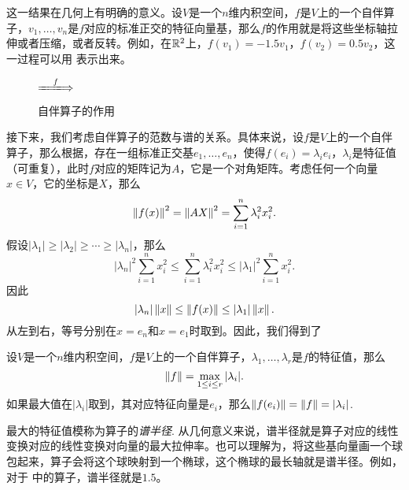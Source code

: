 这一结果在几何上有明确的意义。设$V$是一个$n$维内积空间，$f$是$V$上的一个自伴算子，$v_1,\dots,v_n$是$f$对应的标准正交的特征向量基，那么$f$的作用就是将这些坐标轴拉伸或者压缩，或者反转。例如，在$\mathbb{R}^2$上，$f(v_1)=-1.5v_1$，$f(v_2)=0.5v_2$，这一过程可以用 表示出来。

\begin{figure}[ht]
\centering
\begin{minipage}[c]{0.3\linewidth}
\end{minipage}
$\xLongrightarrow{\quad f\quad}$
\begin{minipage}[c]{0.3\linewidth}
\end{minipage}
\caption{自伴算子的作用}
\label{fig:symmetric-operator}
\end{figure}

接下来，我们考虑自伴算子的范数与谱的关系。具体来说，设$f$是$V$上的一个自伴算子，那么根据，存在一组标准正交基$e_1,\dots,e_n$，使得$f(e_i)=\lambda_i e_i$，$\lambda_i$是特征值（可重复），此时$f$对应的矩阵记为$A$，它是一个对角矩阵。考虑任何一个向量$x\in V$，它的坐标是$X$，那么
\[
    \left\|f(x)\right\|^2=\left\|AX\right\|^2=\sum_{i=1}^n\lambda_i^2x_i^2.
\]
假设$|\lambda_1|\geq|\lambda_2|\geq\cdots\geq|\lambda_n|$，那么
\[
    |\lambda_n|^2\sum_{i=1}^n x_i^2\leq \sum_{i=1}^n\lambda_i^2x_i^2\leq |\lambda_1|^2\sum_{i=1}^n x_i^2.
\]
因此
\[
    |\lambda_n|\left\|x\right\|\leq \left\|f(x)\right\|\leq |\lambda_1|\left\|x\right\|.
\]
从左到右，等号分别在$x=e_n$和$x=e_1$时取到。因此，我们得到了

\begin{proposition}\label{prop:symmetric-operator-norm}
    设$V$是一个$n$维内积空间，$f$是$V$上的一个自伴算子，$\lambda_1,\dots,\lambda_r$是$f$的特征值，那么
    \[\left\|f\right\|=\max_{1\leq i\leq r}|\lambda_i|.\]
    如果最大值在$|\lambda_i|$取到，其对应特征向量是$e_i$，那么$\left\|f(e_i)\right\|=\left\|f\right\|=|\lambda_i|$.
\end{proposition}

最大的特征值模称为算子的\emph{谱半径}. 从几何意义来说，谱半径就是算子对应的线性变换对应的线性变换对向量的最大拉伸率。也可以理解为，将这些基向量画一个球包起来，算子会将这个球映射到一个椭球，这个椭球的最长轴就是谱半径。例如，对于 中的算子，谱半径就是$1.5$。